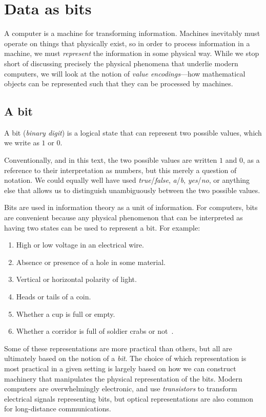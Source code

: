 \chapter{Data as bits}
\label{chap:bits}

A computer is a machine for transforming information.  Machines
inevitably must operate on things that physically exist, so in order
to process information in a machine, we must \emph{represent} the
information in some physical way.  While we stop short of discussing
precisely the physical phenomena that underlie modern computers, we
will look at the notion of \emph{value encodings}---how mathematical
objects can be represented such that they can be processed by
machines.

\section{A bit}

\begin{definition}[Bit]
  A bit (\emph{binary digit}) is a logical state that can represent two possible values,
  which we write as $1$ or $0$.
\end{definition}

Conventionally, and in this text, the two possible values are written
$1$ and $0$, as a reference to their interpretation as numbers, but
this merely a question of notation.  We could equally well have used
\emph{true}/\emph{false}, \emph{a}/\emph{b}, \emph{yes}/\emph{no}, or
anything else that allows us to distinguish unambiguously between the
two possible values.

Bits are used in information theory as a unit of information.  For
computers, bits are convenient because any physical phenomenon that
can be interpreted as having two states can be used to represent a
bit.  For example:
\begin{enumerate}
\item High or low voltage in an electrical wire.
\item Absence or presence of a hole in some material.
\item Vertical or horizontal polarity of light.
\item Heads or tails of a coin.
\item Whether a cup is full or empty.
\item Whether a corridor is full of soldier crabs or
  not~\cite{gunji2011robust}.
\end{enumerate}
Some of these representations are more practical than others, but all
are ultimately based on the notion of a \emph{bit}.  The choice of
which representation is most practical in a given setting is largely
based on how we can construct machinery that manipulates the physical
representation of the bits.  Modern computers are overwhelmingly
electronic, and use \emph{transistors} to transform electrical signals
representing bits, but optical representations are also common for
long-distance communications.

